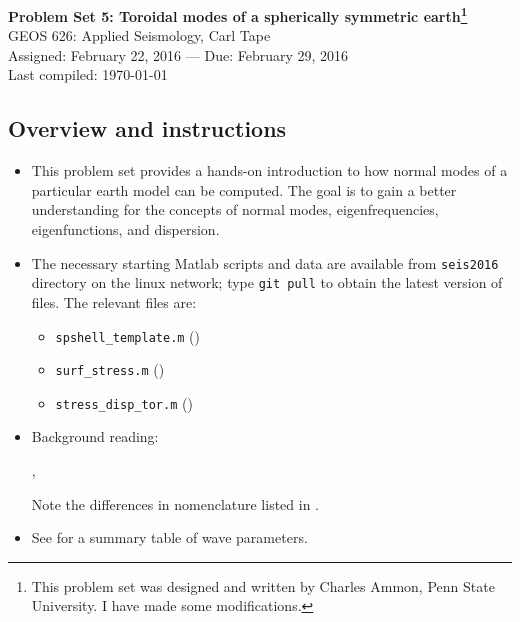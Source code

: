 \documentclass[11pt,titlepage,fleqn]{article}
\begin{document}

\begin{spacing}{1.2}
\centering
{\large \bf Problem Set 5: Toroidal modes of a spherically symmetric earth\footnote{This problem set was designed and written by Charles Ammon, Penn State University. I have made some modifications.}} \\
GEOS 626: Applied Seismology, Carl Tape \\
Assigned: February 22, 2016 --- Due: February 29, 2016 \\
Last compiled: \today \\
\end{spacing}


\subsection*{Overview and instructions}

\begin{itemize}
\item This problem set provides a hands-on introduction to how normal modes of a particular earth model can be computed. The goal is to gain a better understanding for the concepts of normal modes, eigenfrequencies, eigenfunctions, and dispersion.

\item The necessary starting Matlab scripts and data are available from \verb+seis2016+ directory on the linux network; type \verb+git pull+ to obtain the latest version of files. The relevant files are:
%
\begin{itemize}
\item \verb+spshell_template.m+ ()
\item \verb+surf_stress.m+ ()
\item \verb+stress_disp_tor.m+ ()
\end{itemize}

\item Background reading:

\citet[][Section 2.9]{SteinWysession}, \citet[][Ch.~8]{DT}

Note the differences in nomenclature listed in .

\item See  for a summary table of wave parameters.

\end{itemize}
\end{document}

